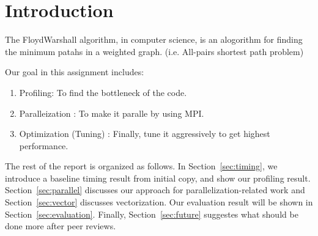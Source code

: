 \section{Introduction}\label{sec:intro}
The Floyd\textendash Warshall algorithm, in computer science, is an alogorithm
for finding the minimum patahs in a weighted graph. (i.e. All-pairs shortest
    path problem)

Our goal in this assignment includes:

\begin{enumerate}
  \item Profiling: To find the bottleneck of the code.
  \item Paralleization : To make it paralle by using MPI.
  \item Optimization (Tuning) : Finally, tune it aggressively to get highest
                                performance.
\end{enumerate}


The rest of the report is organized as follows. In
Section~\ref{sec:timing},
we introduce a baseline timing result from initial copy, and show our
profiling result. 
Section~\ref{sec:parallel} discusses our approach for
parallelization-related work and Section~\ref{sec:vector} discusses
vectorization. Our evaluation result will be shown in
Section~\ref{sec:evaluation}. Finally, Section~\ref{sec:future} suggestes what
should be done more after peer reviews.
